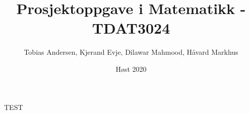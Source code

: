 \documentclass{article}
\title{Prosjektoppgave i Matematikk - TDAT3024}
\author{Tobias Andersen, Kjerand Evje, Dilawar Mahmood, Håvard Markhus}
\date{Høst 2020}
\begin{document}
\maketitle
TEST
\newpage
\tableofcontents
\newpage
\end{document}
